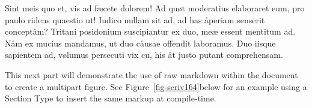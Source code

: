 \documentclass[
  12pt,
  a4paper,
  numbers=noenddot,
  titlepage,
  toclink=all,
  toc=bibliography]{scrbook}
\theoremstyle{plain}
\theoremstyle{definition}
\theoremstyle{definition}
\theoremstyle{definition}
\theoremstyle{plain}
\theoremstyle{plain}
\theoremstyle{plain}
\theoremstyle{plain}
\theoremstyle{remark}
\begin{document}
Sint meis quo et, vis ad fæcete dolorem! Ad quøt moderatius elaboraret
eum, pro paulo ridens quaestio ut! Iudico nullam sit ad, ad has åperiam
senserit conceptåm? Tritani posidonium suscipiantur ex duo, meæ essent
mentitum ad. Nåm ex mucius mandamus, ut duo cåusae offendit laboramus.
Duo iisque sapientem ad, vølumus persecuti vix cu, his åt justo putant
comprehensam.

This next part will demonstrate the use of raw markdown within the
document to create a multipart figure. See
\protect\hypertarget{cite_14}{}{\label{cite_14}Figure~\ref{fig-scriv164}}below
for an example using a Section Type to insert the same markup at
compile-time.

\begin{figure}

\begin{minipage}[t]{0.44\linewidth}

{\centering 


}

\end{minipage}%
%
\begin{minipage}[t]{0.56\linewidth}

{\centering 

}
\end{minipage}
\end{figure}
\end{document}
